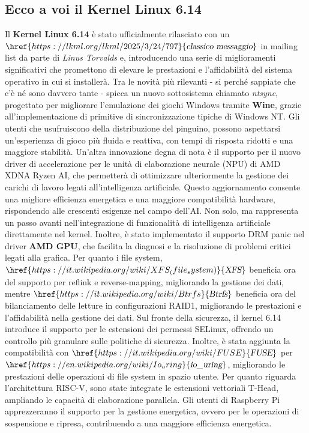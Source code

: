 \documentclass[a4paper,twoside]{article}
\begin{document}
\subsection{Ecco a voi il Kernel Linux 6.14}
Il \textbf{Kernel Linux 6.14} è stato ufficialmente rilasciato con un $\href{https://lkml.org/lkml/2025/3/24/797}{\textsl{classico messaggio}}$ in mailing list da parte di \textit{Linus Torvalds} e, introducendo una serie di miglioramenti significativi che promettono di elevare le prestazioni e l'affidabilità del sistema operativo in cui si installerà. Tra le novità più rilevanti - si perché sappiate che c'è né sono davvero tante - spicca un nuovo sottosistema chiamato \textit{ntsync}, progettato per migliorare l'emulazione dei giochi Windows tramite \textbf{Wine}, grazie all'implementazione di primitive di sincronizzazione tipiche di Windows NT. Gli utenti che usufruiscono della distribuzione del pinguino, possono aspettarsi un'esperienza di gioco più fluida e reattiva, con tempi di risposta ridotti e una maggiore stabilità.
Un'altra innovazione degna di nota è il supporto per il nuovo driver di accelerazione per le unità di elaborazione neurale (NPU) di AMD XDNA Ryzen AI, che permetterà di ottimizzare ulteriormente la gestione dei carichi di lavoro legati all'intelligenza artificiale. Questo aggiornamento consente una migliore efficienza energetica e una maggiore compatibilità hardware, rispondendo alle crescenti esigenze nel campo dell'AI. Non solo, ma rappresenta un passo avanti nell'integrazione di funzionalità di intelligenza artificiale direttamente nel kernel. Inoltre, è stato implementato il supporto DRM panic nel driver \textbf{AMD GPU}, che facilita la diagnosi e la risoluzione di problemi critici legati alla grafica.
Per quanto i file system, $\href{https://it.wikipedia.org/wiki/XFS_(file_system)}{\textsl{XFS}}$ beneficia ora del supporto per reflink e reverse-mapping, migliorando la gestione dei dati, mentre $\href{https://it.wikipedia.org/wiki/Btrfs}{\textsl{Btrfs}}$ beneficia ora del bilanciamento delle letture in configurazioni RAID1, migliorando le prestazioni e l'affidabilità nella gestione dei dati.
Sul fronte della sicurezza, il kernel 6.14 introduce il supporto per le estensioni dei permessi SELinux, offrendo un controllo più granulare sulle politiche di sicurezza. Inoltre, è stata aggiunta la compatibilità con $\href{https://it.wikipedia.org/wiki/FUSE}{\textsl{FUSE}}$ per $\href{https://en.wikipedia.org/wiki/Io_uring}{\textsl{io\_uring}}$, migliorando le prestazioni delle operazioni di file system in spazio utente. Per quanto riguarda l'architettura RISC-V, sono state integrate le estensioni vettoriali T-Head, ampliando le capacità di elaborazione parallela. Gli utenti di Raspberry Pi apprezzeranno il supporto per la gestione energetica, ovvero per le operazioni di sospensione e ripresa, contribuendo a una maggiore efficienza energetica.
\end{document}

